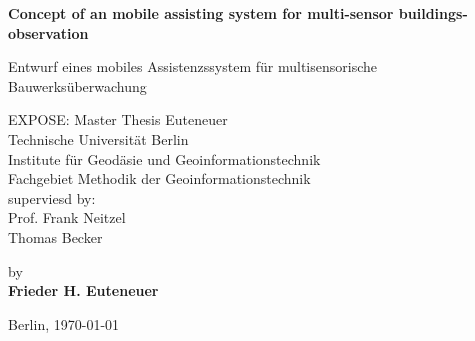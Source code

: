 \begin{center}
\vspace*{\fill}

    {\Large{\bf Concept of an mobile assisting system for multi-sensor buildings-observation}} \vspace{0.5cm}
    
    {\Large{Entwurf eines mobiles Assistenzssystem für multisensorische Bauwerksüberwachung}} \vspace{0.5cm}


    {\normalsize EXPOSE: Master Thesis Euteneuer}\\\vspace{0.5cm}
    {\normalsize Technische Universität Berlin \\
    Institute für Geodäsie und Geoinformationstechnik\\
	Fachgebiet Methodik der Geoinformationstechnik\\
	superviesd by:\\	
	Prof. Frank Neitzel\\
	Thomas Becker}\vspace{1cm}

    {\normalsize by \\\vspace{0.5cm}
    {\bf Frieder H. Euteneuer}} \vspace{1cm}
		

    {\normalsize Berlin, \today}
\vfill
\end{center}
